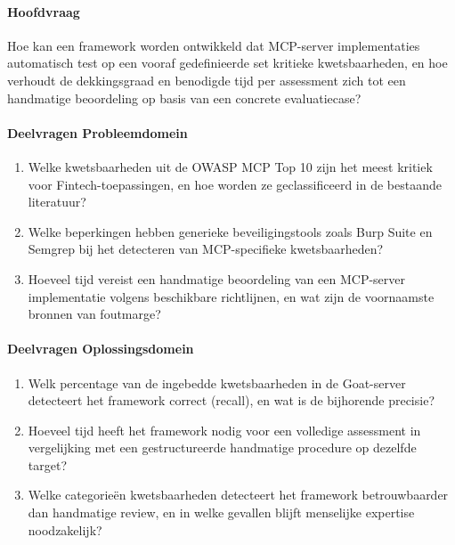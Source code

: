 \paragraph{Hoofdvraag}
Hoe kan een framework worden ontwikkeld dat MCP-server implementaties automatisch test op een vooraf gedefinieerde set kritieke kwetsbaarheden, en hoe verhoudt de dekkingsgraad en benodigde tijd per assessment zich tot een handmatige beoordeling op basis van een concrete evaluatiecase?

\paragraph{Deelvragen Probleemdomein}
\begin{enumerate}
  \item Welke kwetsbaarheden uit de OWASP MCP Top 10 zijn het meest kritiek voor Fintech-toepassingen, en hoe worden ze geclassificeerd in de bestaande literatuur?
  \item Welke beperkingen hebben generieke beveiligingstools zoals Burp Suite en Semgrep bij het detecteren van MCP-specifieke kwetsbaarheden?
  \item Hoeveel tijd vereist een handmatige beoordeling van een MCP-server implementatie volgens beschikbare richtlijnen, en wat zijn de voornaamste bronnen van foutmarge?
\end{enumerate}

\paragraph{Deelvragen Oplossingsdomein}
\begin{enumerate}
  \item Welk percentage van de ingebedde kwetsbaarheden in de Goat-server detecteert het framework correct (recall), en wat is de bijhorende precisie?
  \item Hoeveel tijd heeft het framework nodig voor een volledige assessment in vergelijking met een gestructureerde handmatige procedure op dezelfde target?
  \item Welke categorieën kwetsbaarheden detecteert het framework betrouwbaarder dan handmatige review, en in welke gevallen blijft menselijke expertise noodzakelijk?
\end{enumerate}


